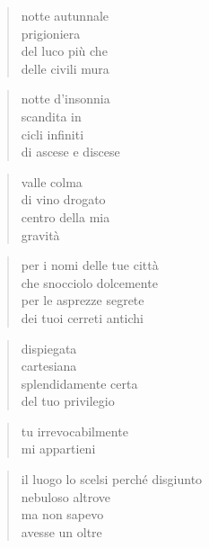 \clearpage


\begin{verse}
    notte autunnale\\
    prigioniera\\
    del luco più che\\
    delle civili mura
\end{verse}

\begin{verse}
    notte d'insonnia\\
    scandita in\\
    cicli infiniti\\
    di ascese e discese 
\end{verse}

\begin{verse}
    valle colma\\
    di vino drogato\\
    centro della mia\\
    gravità
\end{verse}

\clearpage


\begin{verse}
    per i nomi delle tue città\\
    che snocciolo dolcemente\\
    per le asprezze segrete\\
    dei tuoi cerreti antichi
\end{verse}

\begin{verse}
    dispiegata\\
    cartesiana\\
    splendidamente certa\\
    del tuo privilegio
\end{verse}

\begin{verse}
    tu irrevocabilmente\\
    mi appartieni
\end{verse}

\clearpage


\begin{verse}
    il luogo lo scelsi perché disgiunto\\
    nebuloso altrove\\
    ma non sapevo\\
    avesse un oltre
\end{verse}

